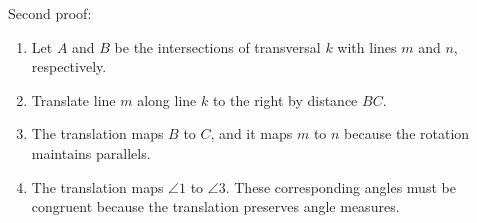 \documentclass[nooutcomes]{ximera}
\begin{document}
\begin{problem}
Second proof: 
\begin{enumerate}
\item Let $A$ and $B$ be the intersections of transversal $k$ with lines $m$ and $n$, respectively. 
\item Translate line $m$ along line $k$ to the right by distance $BC$.  
\item The translation maps $B$ to $C$, and it maps $m$ to $n$ because the rotation maintains parallels. 
\item The translation maps $\angle 1$ to $\angle 3$.  These corresponding angles must be congruent because the translation preserves angle measures. 
\end{enumerate}

\end{problem}
\end{document}
